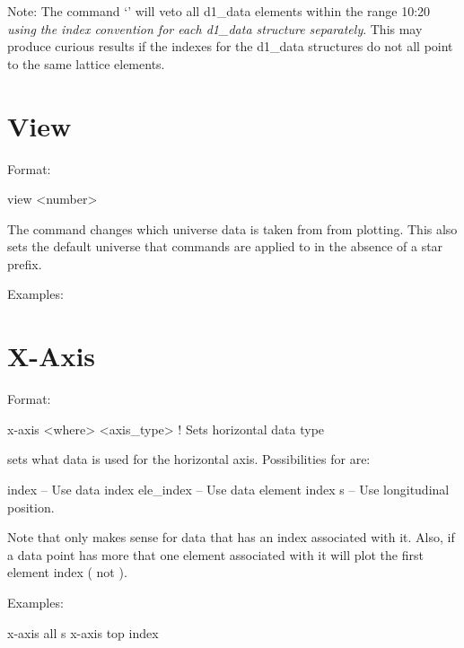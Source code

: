 Note: The command `' will veto all d1\_data elements
within the range 10:20 \textit{using the index convention for each d1\_data
structure separately}. This may produce curious results if the
indexes for the d1\_data structures do not all point to the same lattice
elements. 

\section{View}
\label{s:view}

Format:
\begin{example}
  view <number>
\end{example}

\vskip 0.2in 
The  command changes which universe data is taken from from
plotting.  This also sets the default universe that commands are
applied to in the absence of a star prefix.

Examples:

\section{X-Axis}
\label{s:x-axis}

Format:
\begin{example}
  x-axis <where> <axis_type> ! Sets horizontal data type
\end{example}

\vskip 0.2in 
 sets what data is used for the horizontal
axis. Possibilities for  are:
\begin{example}
  index     -- Use data index
  ele_index -- Use data element index
  s         -- Use longitudinal position.
\end{example}
Note that  only makes sense for data that has an index
associated with it. Also, if a data point has more that one element associated
with it  will plot the first element index ( not
).

Examples:
\begin{example}
  x-axis all s
  x-axis top index
\end{example}

